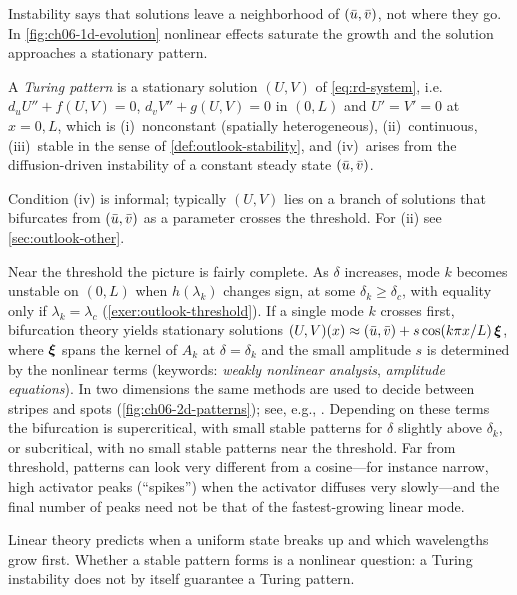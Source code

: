 Instability says that solutions leave a neighborhood of $(\bar u,\bar v)$, not where they
go. In \cref{fig:ch06-1d-evolution} nonlinear effects saturate the growth and the
solution approaches a stationary pattern.

\begin{definition}\label{def:turing-pattern}
A \emph{Turing pattern} is a stationary solution $(U,V)$ of \eqref{eq:rd-system},
i.e.\ $d_uU''+f(U,V)=0$, $d_vV''+g(U,V)=0$ in $(0,L)$ and $U'=V'=0$ at $x=0,L$,
which is (i)~nonconstant (spatially heterogeneous), (ii)~continuous, (iii)~stable in
the sense of \cref{def:outlook-stability}, and (iv)~arises from the diffusion-driven
instability of a constant steady state $(\bar u,\bar v)$.
\end{definition}

Condition (iv) is informal; typically $(U,V)$ lies on a branch of solutions that
bifurcates from $(\bar u,\bar v)$ as a parameter crosses the threshold. For (ii) see
\cref{sec:outlook-other}.

Near the threshold the picture is fairly complete. As $\delta$ increases, mode $k$
becomes unstable on $(0,L)$ when $h(\lambda_k)$ changes sign, at some
$\delta_k\ge\delta_c$, with equality only if $\lambda_k=\lambda_c$
(\cref{exer:outlook-threshold}). If a single mode $k$ crosses first, bifurcation
theory yields stationary solutions
${(U,V)(x)\approx(\bar u,\bar v)+s\cos(k\pi x/L)\,\boldsymbol{\xi}}$, where $\boldsymbol{\xi}$ spans the
kernel of $A_k$ at $\delta=\delta_k$ and the small amplitude $s$ is determined
by the nonlinear terms (keywords: \emph{weakly nonlinear analysis}, \emph{amplitude
equations}). In two dimensions the same methods are used to decide between stripes
and spots (\cref{fig:ch06-2d-patterns}); see, e.g., \cite{Murray2003}. Depending on these terms the bifurcation is
supercritical, with small stable patterns for $\delta$ slightly above $\delta_k$, or
subcritical, with no small stable patterns near the threshold. Far from threshold,
patterns can look very different from a cosine---for instance narrow, high activator
peaks (``spikes'') when the activator diffuses very slowly---and the final number of
peaks need not be that of the fastest-growing linear mode.

\begin{keyidea}
Linear theory predicts when a uniform state breaks up and which wavelengths grow
first. Whether a stable pattern forms is a nonlinear question: a Turing instability
does not by itself guarantee a Turing pattern.
\end{keyidea}

